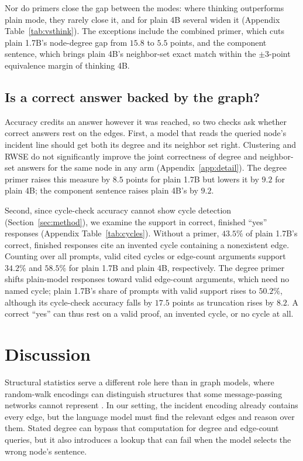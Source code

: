 \documentclass[11pt]{article}
\begin{document}
Nor do primers close the gap between the modes: where thinking outperforms plain mode, they rarely close it, and for plain 4B several widen it (Appendix Table~\ref{tab:vsthink}). The exceptions include the combined primer, which cuts plain 1.7B's node-degree gap from $15.8$ to $5.5$ points, and the component sentence, which brings plain 4B's neighbor-set exact match within the $\pm3$-point equivalence margin of thinking 4B. %

\subsection{Is a correct answer backed by the graph?}
\label{sec:reston}
Accuracy credits an answer however it was reached, so two checks ask whether correct answers rest on the edges. First, a model that reads the queried node's incident line should get both its degree and its neighbor set right. Clustering and RWSE do not significantly improve the joint correctness of degree and neighbor-set answers for the same node in any arm (Appendix~\ref{app:detail}). The degree primer raises this measure by $8.5$ points for plain 1.7B but lowers it by $9.2$ for plain 4B; the component sentence raises plain 4B's by $9.2$. %

Second, since cycle-check accuracy cannot show cycle detection (Section~\ref{sec:method}), we examine the support in correct, finished ``yes'' responses (Appendix Table~\ref{tab:cycles}). Without a primer, $43.5\%$ of plain 1.7B's correct, finished responses cite an invented cycle containing a nonexistent edge. %
Counting over all prompts, valid cited cycles or edge-count arguments support $34.2\%$ and $58.5\%$ for plain 1.7B and plain 4B, respectively. %
The degree primer shifts plain-model responses toward valid edge-count arguments, which need no named cycle; plain 1.7B's share of prompts with valid support rises to $50.2\%$, although its cycle-check accuracy falls by $17.5$ points as truncation rises by $8.2$. A correct ``yes'' can thus rest on a valid proof, an invented cycle, or no cycle at all. %

\section{Discussion}
\label{sec:discussion}
Structural statistics serve a different role here than in graph models, where random-walk encodings can distinguish structures that some message-passing networks cannot represent \citep{xu2019powerful,dwivedi2022graph}. In our setting, the incident encoding already contains every edge, but the language model must find the relevant edges and reason over them. Stated degree can bypass that computation for degree and edge-count queries, but it also introduces a lookup that can fail when the model selects the wrong node's sentence.
\end{document}
